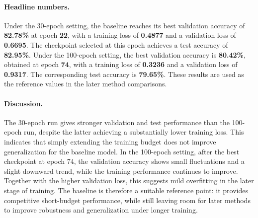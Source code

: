\paragraph{Headline numbers.}
Under the 30-epoch setting, the baseline reaches its best validation
accuracy of \textbf{82.78\%} at epoch \textbf{22}, with a training loss
of \textbf{0.4877} and a validation loss of \textbf{0.6695}. The
checkpoint selected at this epoch achieves a test accuracy of
\textbf{82.95\%}. Under the 100-epoch setting, the best validation
accuracy is \textbf{80.42\%}, obtained at epoch \textbf{74}, with a
training loss of \textbf{0.3236} and a validation loss of
\textbf{0.9317}. The corresponding test accuracy is \textbf{79.65\%}.
These results are used as the reference values in the later method
comparisons.

\paragraph{Discussion.}
The 30-epoch run gives stronger validation and test performance than the
100-epoch run, despite the latter achieving a substantially lower
training loss. This indicates that simply extending the training budget
does not improve generalization for the baseline model. In the 100-epoch
setting, after the best checkpoint at epoch 74, the validation accuracy
shows small fluctuations and a slight downward trend, while the training
performance continues to improve. Together with the higher validation
loss, this suggests mild overfitting in the later stage of training. The
baseline is therefore a suitable reference point: it provides competitive
short-budget performance, while still leaving room for later methods to
improve robustness and generalization under longer training.
